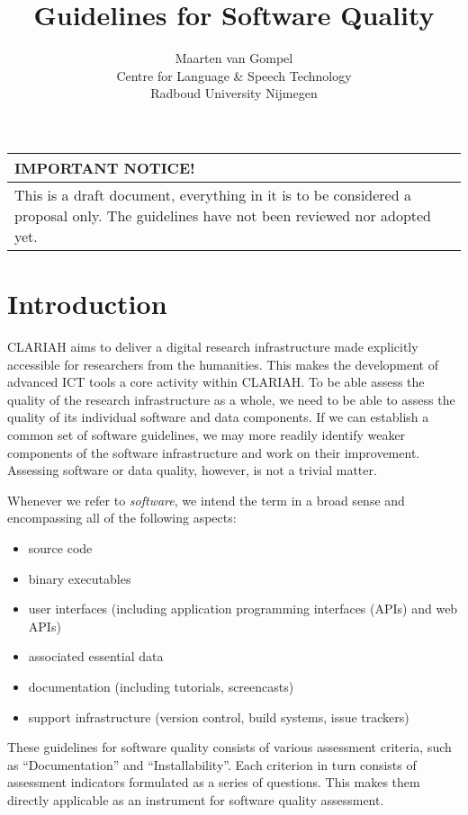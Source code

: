 \documentclass[a4paper,11pt]{article}
\newcommand{\subtitle}[1]{%
  \posttitle{%
    \par\end{center}
    \begin{center}\large#1\end{center}
    \vskip0.5em}%
}
\newenvironment{notice}{
\begin{center}
    \begin{tabular}[h!]{|p{0.8\textwidth}|}
    \hline
    {\bf IMPORTANT NOTICE!}\\\hline}
{   \\\hline
    \end{tabular}
\end{center}}
\begin{document}
\title{Guidelines for Software Quality}
\subtitle{CLARIAH Task 54.100} 
\author{Maarten van Gompel \\ Centre for Language \& Speech Technology \\ Radboud University Nijmegen }

\maketitle

\begin{notice} 
This is a draft document, everything in it is to be considered a
proposal only. The guidelines have not been reviewed nor adopted yet.
\end{notice}

\tableofcontents

\section{Introduction}

CLARIAH aims to deliver a digital research infrastructure made explicitly
accessible for researchers from the humanities. This makes the development of advanced ICT
tools a core activity within CLARIAH. To be able assess the
quality of the research infrastructure as a whole, we need to be able to assess
the quality of its individual software and data components. If we can establish
a common set of software guidelines, we may more readily identify weaker
components of the software infrastructure and work on their improvement.
Assessing software or data quality, however, is not a trivial matter. 

Whenever we refer to \emph{software}, we intend the term in a broad sense and
encompassing all of the following aspects:
\begin{itemize}
    \item source code
    \item binary executables
    \item user interfaces (including application programming interfaces (APIs) and web APIs)
    \item associated essential data
    \item documentation (including tutorials, screencasts)
    \item support infrastructure (version control, build systems, issue trackers)
\end{itemize}

These guidelines for software quality consists of various assessment
criteria, such as ``Documentation'' and ``Installability''. Each criterion in turn
consists of assessment indicators formulated as a series of questions. This
makes them directly applicable as an instrument for software quality
assessment. 
\end{document}
